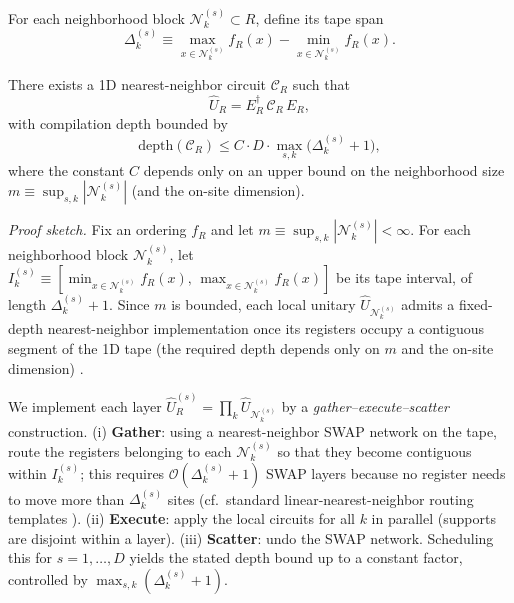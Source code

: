 For each neighborhood block $\mathcal{N}_k^{(s)} \subset R$, define its tape span
\begin{equation}
    \Delta_k^{(s)} \equiv \max_{x\in \mathcal{N}_k^{(s)}} f_R(x)-\min_{x\in \mathcal{N}_k^{(s)}} f_R(x).
\end{equation}

\begin{proposition}
\label{prop:exact_1d_compilation}
There exists a 1D nearest-neighbor circuit $\mathcal C_R$ such that
\begin{equation}
    \hat{U}_R = E_R^\dagger \, \mathcal C_R \, E_R,
\end{equation}
with compilation depth bounded by
\begin{equation}
    \mathrm{depth}(\mathcal C_R)\le C\cdot D\cdot \max_{s,k}\big(\Delta_k^{(s)}+1\big),
\end{equation}
where the constant $C$ depends only on an upper bound on the neighborhood size $m\equiv \sup_{s,k}|\mathcal{N}_k^{(s)}|$ (and the on-site dimension).
\end{proposition}
\textit{Proof sketch.}
Fix an ordering $f_R$ and let $m\equiv \sup_{s,k}|\mathcal{N}_k^{(s)}|<\infty$. For each neighborhood block $\mathcal{N}_k^{(s)}$, let $I_k^{(s)}\equiv[\min_{x\in\mathcal N_k^{(s)}}f_R(x),\,\max_{x\in\mathcal N_k^{(s)}}f_R(x)]$ be its tape interval, of length $\Delta_k^{(s)}+1$. Since $m$ is bounded, each local unitary $\hat{U}_{\mathcal{N}_k^{(s)}}$ admits a fixed-depth nearest-neighbor implementation once its registers occupy a contiguous segment of the 1D tape (the required depth depends only on $m$ and the on-site dimension) \cite{NielsenChuang2000}.\par
We implement each layer $\hat U_R^{(s)}=\prod_k \hat U_{\mathcal N_k^{(s)}}$ by a \emph{gather--execute--scatter} construction. (i) \textbf{Gather}: using a nearest-neighbor SWAP network on the tape, route the registers belonging to each $\mathcal{N}_k^{(s)}$ so that they become contiguous within $I_k^{(s)}$; this requires $\mathcal{O}(\Delta_k^{(s)}+1)$ SWAP layers because no register needs to move more than $\Delta_k^{(s)}$ sites (cf.\ standard linear-nearest-neighbor routing templates \cite{Hirata2011LNN}). (ii) \textbf{Execute}: apply the local circuits for all $k$ in parallel (supports are disjoint within a layer). (iii) \textbf{Scatter}: undo the SWAP network. Scheduling this for $s=1,\dots,D$ yields the stated depth bound up to a constant factor, controlled by $\max_{s,k}(\Delta_k^{(s)}+1)$.

